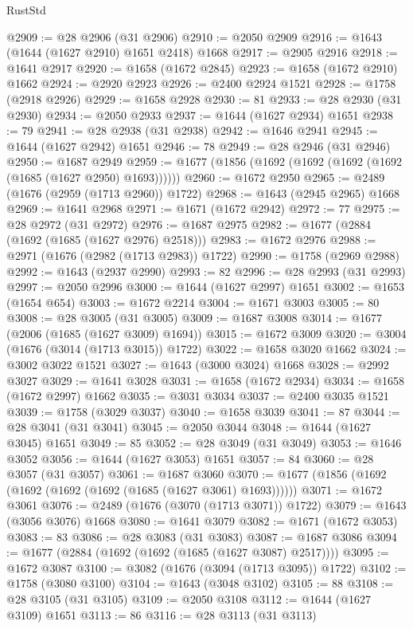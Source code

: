 \begin{lexlean}{RustStd}
\begin{coremodule}
@2909 := @28 @2906 (@31 @2906)
@2910 := @2050 @2909
@2916 := @1643 (@1644 (@1627 @2910) @1651 @2418) @1668
@2917 := @2905 @2916
@2918 := @1641 @2917
@2920 := @1658 (@1672 @2845)
@2923 := @1658 (@1672 @2910) @1662
@2924 := @2920 @2923
@2926 := @2400 @2924 @1521
@2928 := @1758 (@2918 @2926)
@2929 := @1658 @2928
@2930 := 81
@2933 := @28 @2930 (@31 @2930)
@2934 := @2050 @2933
@2937 := @1644 (@1627 @2934) @1651
@2938 := 79
@2941 := @28 @2938 (@31 @2938)
@2942 := @1646 @2941
@2945 := @1644 (@1627 @2942) @1651
@2946 := 78
@2949 := @28 @2946 (@31 @2946)
@2950 := @1687 @2949
@2959 := @1677 (@1856 (@1692 (@1692 (@1692 (@1692 (@1685 (@1627 @2950) @1693))))))
@2960 := @1672 @2950
@2965 := @2489 (@1676 (@2959 (@1713 @2960)) @1722)
@2968 := @1643 (@2945 @2965) @1668
@2969 := @1641 @2968
@2971 := @1671 (@1672 @2942)
@2972 := 77
@2975 := @28 @2972 (@31 @2972)
@2976 := @1687 @2975
@2982 := @1677 (@2884 (@1692 (@1685 (@1627 @2976) @2518)))
@2983 := @1672 @2976
@2988 := @2971 (@1676 (@2982 (@1713 @2983)) @1722)
@2990 := @1758 (@2969 @2988)
@2992 := @1643 (@2937 @2990)
@2993 := 82
@2996 := @28 @2993 (@31 @2993)
@2997 := @2050 @2996
@3000 := @1644 (@1627 @2997) @1651
@3002 := @1653 (@1654 @654)
@3003 := @1672 @2214
@3004 := @1671 @3003
@3005 := 80
@3008 := @28 @3005 (@31 @3005)
@3009 := @1687 @3008
@3014 := @1677 (@2006 (@1685 (@1627 @3009) @1694))
@3015 := @1672 @3009
@3020 := @3004 (@1676 (@3014 (@1713 @3015)) @1722)
@3022 := @1658 @3020 @1662
@3024 := @3002 @3022 @1521
@3027 := @1643 (@3000 @3024) @1668
@3028 := @2992 @3027
@3029 := @1641 @3028
@3031 := @1658 (@1672 @2934)
@3034 := @1658 (@1672 @2997) @1662
@3035 := @3031 @3034
@3037 := @2400 @3035 @1521
@3039 := @1758 (@3029 @3037)
@3040 := @1658 @3039
@3041 := 87
@3044 := @28 @3041 (@31 @3041)
@3045 := @2050 @3044
@3048 := @1644 (@1627 @3045) @1651
@3049 := 85
@3052 := @28 @3049 (@31 @3049)
@3053 := @1646 @3052
@3056 := @1644 (@1627 @3053) @1651
@3057 := 84
@3060 := @28 @3057 (@31 @3057)
@3061 := @1687 @3060
@3070 := @1677 (@1856 (@1692 (@1692 (@1692 (@1692 (@1685 (@1627 @3061) @1693))))))
@3071 := @1672 @3061
@3076 := @2489 (@1676 (@3070 (@1713 @3071)) @1722)
@3079 := @1643 (@3056 @3076) @1668
@3080 := @1641 @3079
@3082 := @1671 (@1672 @3053)
@3083 := 83
@3086 := @28 @3083 (@31 @3083)
@3087 := @1687 @3086
@3094 := @1677 (@2884 (@1692 (@1692 (@1685 (@1627 @3087) @2517))))
@3095 := @1672 @3087
@3100 := @3082 (@1676 (@3094 (@1713 @3095)) @1722)
@3102 := @1758 (@3080 @3100)
@3104 := @1643 (@3048 @3102)
@3105 := 88
@3108 := @28 @3105 (@31 @3105)
@3109 := @2050 @3108
@3112 := @1644 (@1627 @3109) @1651
@3113 := 86
@3116 := @28 @3113 (@31 @3113)

\end{coremodule}
\end{lexlean}
